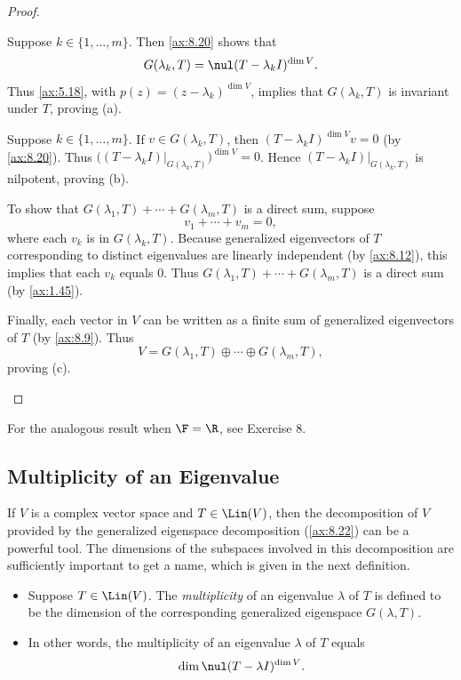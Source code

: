 \begin{proof}\leavevmode
\begin{parts}
\item Suppose $k\in\{1,\dots,m\}$. Then \ref{ax:8.20} shows that
  \[ G(\lambda_k,T) = \nul(T-\lambda_kI)^{\dim V}. \]
  Thus \ref{ax:5.18}, with $p(z)=(z-\lambda_k)^{\dim V}$, implies that
  $G(\lambda_k,T)$ is invariant under $T$, proving (a).
\item Suppose $k\in\{1,\dots,m\}$. If $v\in G(\lambda_k,T)$, then
  $(T-\lambda_kI)^{\dim V}v=0$ (by \ref{ax:8.20}). Thus
  $\bigl((T-\lambda_kI)|_{G(\lambda_k,T)}\bigr)^{\dim V}=0$. Hence
  $(T-\lambda_kI)|_{G(\lambda_k,T)}$ is nilpotent, proving (b).
\item To show that $G(\lambda_1,T)+\cdots+G(\lambda_m,T)$ is a direct sum,
  suppose
  \[ v_1+\cdots+v_m = 0, \]
  where each $v_k$ is in $G(\lambda_k,T)$. Because generalized eigenvectors of
  $T$ corresponding to distinct eigenvalues are linearly independent (by
  \ref{ax:8.12}), this implies that each $v_k$ equals $0$. Thus
  $G(\lambda_1,T)+\cdots+G(\lambda_m,T)$ is a direct sum (by \ref{ax:1.45}).

  Finally, each vector in $V$ can be written as a finite sum of generalized
  eigenvectors of $T$ (by \ref{ax:8.9}). Thus
  \[ V = G(\lambda_1,T)\oplus\cdots\oplus G(\lambda_m,T), \]
  proving (c).\qedhere
\end{parts}
\end{proof}

For the analogous result when $\F=\R$, see Exercise 8.

\subsection{Multiplicity of an Eigenvalue}

If $V$ is a complex vector space and $T\in\Lin(V)$, then the decomposition of
$V$ provided by the generalized eigenspace decomposition (\ref{ax:8.22}) can be
a powerful tool. The dimensions of the subspaces involved in this decomposition
are sufficiently important to get a name, which is given in the next
definition.

\begin{definition}[Multiplicity]\label{ax:8.23}\leavevmode
\begin{itemize}
\item Suppose $T\in\Lin(V)$. The \emph{multiplicity} of an eigenvalue $\lambda$
  of $T$ is defined to be the dimension of the corresponding generalized
  eigenspace $G(\lambda,T)$.
\item In other words, the multiplicity of an eigenvalue $\lambda$ of $T$ equals
  \[ \dim\nul(T-\lambda I)^{\dim V}. \]
\end{itemize}
\end{definition}

